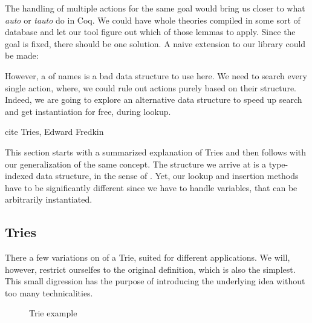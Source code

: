The handling of multiple actions for the same goal would bring us closer to what
\emph{auto} or \emph{tauto} do in Coq. We could have whole theories compiled in some sort
of database and let our tool figure out which of those lemmas to apply. Since the goal is
fixed, there should be one solution. A naive extension to our library could be made:


However, a  of names is a bad data structure to use here. We need to search
every single action, where, we could rule out actions purely based on their structure.
Indeed, we are going to explore an alternative data structure to speed up search and get
instantiation for free, during lookup.

\begin{TODO}
  \item cite Tries, Edward Fredkin
\end{TODO}

This section starts with a summarized explanation of Tries and then follows with our
generalization of the same concept. The structure we arrive at is a type-indexed data structure,
in the sense of \cite{Hinze04}. Yet, our lookup and insertion methods have to be significantly different
since we have to handle variables, that can be arbitrarily instantiated.

\subsection{Tries}

There a few variations on of a Trie, suited for different applications. We will, however,
restrict ourselfes to the original definition, which is also the simplest. This small digression
has the purpose of introducing the underlying idea without too many technicalities.

\begin{wrapfigure}{r}{0.30\textwidth}
\begin{center}
\end{center}
\caption{Trie example}
\label{fig:firsttrie}
\end{wrapfigure}

